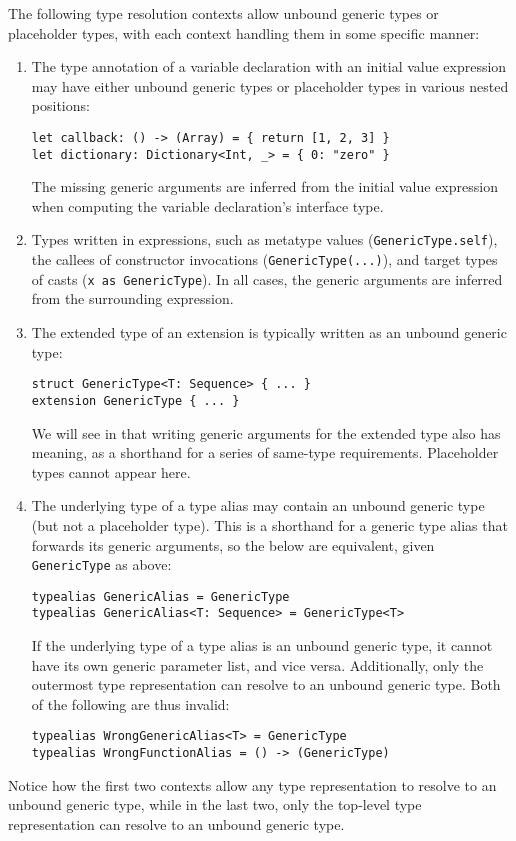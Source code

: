 \documentclass[../generics]{subfiles}
\begin{document}
The following type resolution contexts allow unbound generic types or placeholder types, with each context handling them in some specific manner:
\begin{enumerate}

\item The type annotation of a variable declaration with an initial value expression may have either unbound generic types or placeholder types in various nested positions:
\begin{Verbatim}
let callback: () -> (Array) = { return [1, 2, 3] }
let dictionary: Dictionary<Int, _> = { 0: "zero" }
\end{Verbatim}
The missing generic arguments are inferred from the initial value expression when computing the variable declaration's interface type.

\item Types written in expressions, such as metatype values (\texttt{GenericType.self}), the callees of constructor invocations (\texttt{GenericType(...)}), and target types of casts (\texttt{x as GenericType}). In all cases, the generic arguments are inferred from the surrounding expression.

\item The extended type of an extension is typically written as an unbound generic type:
\begin{Verbatim}
struct GenericType<T: Sequence> { ... }
extension GenericType { ... }
\end{Verbatim}
We will see in  that writing generic arguments for the extended type also has meaning, as a shorthand for a series of same-type requirements. Placeholder types cannot appear here.

\item The underlying type of a type alias may contain an unbound generic type (but not a placeholder type). This is a shorthand for a generic type alias that forwards its generic arguments, so the below are equivalent, given \texttt{GenericType} as above:
\begin{Verbatim}
typealias GenericAlias = GenericType
typealias GenericAlias<T: Sequence> = GenericType<T>
\end{Verbatim}
If the underlying type of a type alias is an unbound generic type, it cannot have its own generic parameter list, and vice versa. Additionally, only the outermost type representation can resolve to an unbound generic type. Both of the following are thus invalid:
\begin{Verbatim}
typealias WrongGenericAlias<T> = GenericType
typealias WrongFunctionAlias = () -> (GenericType)
\end{Verbatim}
\end{enumerate}
Notice how the first two contexts allow any type representation to resolve to an unbound generic type, while in the last two, only the top-level type representation can resolve to an unbound generic type.
\end{document}
